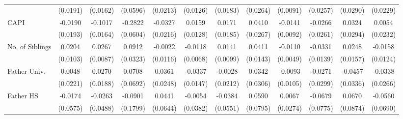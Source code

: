 \begin{table}[htbp]
\begin{tabular}{l*{11}{c}}
            &    (0.0191)         &    (0.0162)         &    (0.0596)         &    (0.0213)         &    (0.0126)         &    (0.0183)         &    (0.0264)         &    (0.0091)         &    (0.0257)         &    (0.0290)         &    (0.0229)         \\
\addlinespace
CAPI        &     -0.0190         &     -0.1017\sym{***}&     -0.2822\sym{***}&     -0.0327         &      0.0159         &      0.0171         &      0.0410         &     -0.0141         &     -0.0266         &      0.0324         &      0.0054         \\
            &    (0.0193)         &    (0.0164)         &    (0.0604)         &    (0.0216)         &    (0.0128)         &    (0.0185)         &    (0.0267)         &    (0.0092)         &    (0.0261)         &    (0.0294)         &    (0.0232)         \\
\addlinespace
No. of Siblings&      0.0204\sym{*}  &      0.0267\sym{**} &      0.0912\sym{**} &     -0.0022         &     -0.0118         &      0.0141         &      0.0411\sym{**} &     -0.0110\sym{*}  &     -0.0331\sym{*}  &      0.0248         &     -0.0158         \\
            &    (0.0103)         &    (0.0087)         &    (0.0323)         &    (0.0116)         &    (0.0068)         &    (0.0099)         &    (0.0143)         &    (0.0049)         &    (0.0139)         &    (0.0157)         &    (0.0124)         \\
\addlinespace
Father Univ.&      0.0048         &      0.0270         &      0.0708         &      0.0361         &     -0.0337\sym{*}  &     -0.0028         &      0.0342         &     -0.0093         &     -0.0271         &     -0.0457         &     -0.0338         \\
            &    (0.0221)         &    (0.0188)         &    (0.0692)         &    (0.0248)         &    (0.0147)         &    (0.0212)         &    (0.0306)         &    (0.0105)         &    (0.0299)         &    (0.0336)         &    (0.0266)         \\
\addlinespace
Father HS   &     -0.0174         &     -0.0263         &     -0.0901         &      0.0441         &     -0.0054         &     -0.0384         &      0.0590         &      0.0067         &     -0.0679         &      0.0670         &     -0.0560         \\
            &    (0.0575)         &    (0.0488)         &    (0.1799)         &    (0.0644)         &    (0.0382)         &    (0.0551)         &    (0.0795)         &    (0.0274)         &    (0.0775)         &    (0.0874)         &    (0.0690)         \\

\end{tabular}
\end{table}
